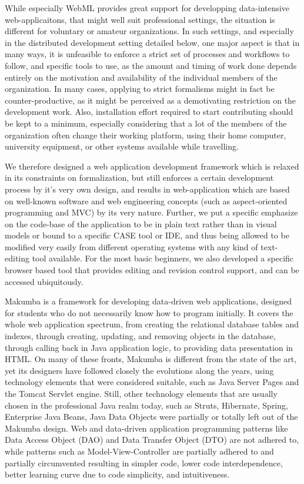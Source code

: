 \documentclass{llncs}
\begin{document}
While especially WebML provides great support for developping data-intensive web-applicaitons, that might well suit professional settings, the situation is different for voluntary or amateur organizations. In such settings, and especially in the distributed development setting detailed below, one major aspect is that in many ways, it is unfeasible to enforce a strict set of processes and workflows to follow, and specific tools to use, as the amount and timing of work done depends entirely on the motivation and availability of the individual members of the organization. In many cases, applying to strict formalisms might in fact be counter-productive, as it might be perceived as a demotivating restriction on the development work. Also, installation effort required to start contributing should be kept to a minimum, especially considering that a lot of the members of the organization often change their working platform, using their home computer, university equipment, or other systems available while travelling.

We therefore designed a web application development framework which is relaxed in its constraints on formalization, but still enforces a certain development process by it's very own design, and results in web-application which are based on well-known software and web engineering concepts (such as aspect-oriented programming and MVC) by its very nature. Further, we put a specific emphasize on the code-base of the application to be in plain text rather than in visual models or bound to a specific CASE tool or IDE, and thus being allowed to be modified very easily from different operating systems with any kind of text-editing tool available. For the most basic beginners, we also developed a specific browser based tool that provides editing and revision control support, and can be accessed ubiquitously.

Makumba is a framework for developing data-driven web applications, designed for students who do not necessarily know how to program initially. It covers the whole  web application spectrum, from creating the relational database tables and indexes, through creating, updating, and removing objects in the database, through calling back in Java application logic, to providing data presentation in HTML. On many of these fronts, Makumba is different from the state of the art, yet its designers have followed closely the evolutions along the years, using technology elements that were considered suitable, such as Java Server Pages and the Tomcat Servlet engine. Still, other technology elements that are usually chosen in the professional Java realm today, such as Struts,
Hibernate, Spring, Enterprise Java Beans, Java Data Objects were partially or totally left out of the Makumba design. Web and data-driven application programming patterns like Data Access Object (DAO) and Data Transfer Object (DTO) are not adhered to, while patterns such as Model-View-Controller are partially adhered to and partially circumvented resulting in simpler code, lower code interdependence, better learning curve due to code simplicity, and intuitiveness. 
\end{document}
